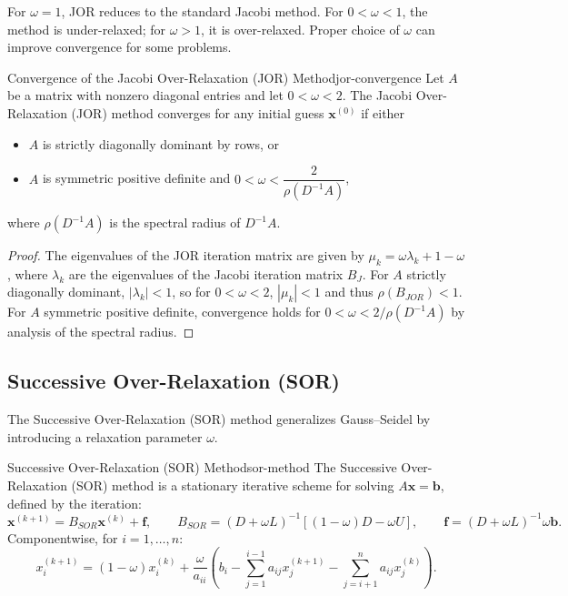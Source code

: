     For \(\omega = 1\), JOR reduces to the standard Jacobi method. For \(0 < \omega < 1\), the method is under-relaxed; for \(\omega > 1\), it is over-relaxed. Proper choice of \(\omega\) can improve convergence for some problems.
\begin{theorem}{Convergence of the Jacobi Over-Relaxation (JOR) Method}{jor-convergence}
    Let \(A\) be a matrix with nonzero diagonal entries and let \(0 < \omega < 2\). The Jacobi Over-Relaxation (JOR) method converges for any initial guess \(\mathbf{x}^{(0)}\) if either
    \begin{itemize}
        \item \(A\) is strictly diagonally dominant by rows, or
        \item \(A\) is symmetric positive definite and \(0 < \omega < \dfrac{2}{\rho(D^{-1}A)}\),
    \end{itemize}
    where \(\rho(D^{-1}A)\) is the spectral radius of \(D^{-1}A\).
\end{theorem}
\begin{proof}
    The eigenvalues of the JOR iteration matrix are given by \(\mu_k = \omega \lambda_k + 1 - \omega\), where \(\lambda_k\) are the eigenvalues of the Jacobi iteration matrix \(B_J\). For \(A\) strictly diagonally dominant, \(|\lambda_k| < 1\), so for \(0 < \omega < 2\), \(|\mu_k| < 1\) and thus \(\rho(B_{JOR}) < 1\). For \(A\) symmetric positive definite, convergence holds for \(0 < \omega < 2/\rho(D^{-1}A)\) by analysis of the spectral radius.
\end{proof}

\subsection{Successive Over-Relaxation (SOR)}
The Successive Over-Relaxation (SOR) method generalizes Gauss--Seidel by introducing a relaxation parameter \(\omega\).

\begin{definition}{Successive Over-Relaxation (SOR) Method}{sor-method}
    The Successive Over-Relaxation (SOR) method is a stationary iterative scheme for solving \(A\mathbf{x} = \mathbf{b}\), defined by the iteration:
    \[
        \mathbf{x}^{(k+1)} = B_{SOR} \mathbf{x}^{(k)} + \mathbf{f}, \qquad
        B_{SOR} = (D + \omega L)^{-1} \left[(1-\omega)D - \omega U\right], \qquad
        \mathbf{f} = (D + \omega L)^{-1} \omega \mathbf{b}.
    \]
    Componentwise, for \(i = 1, \ldots, n\):
    \begin{equation*}
        x_i^{(k+1)} = (1-\omega)x_i^{(k)} + \frac{\omega}{a_{ii}}\left(b_i - \sum_{j=1}^{i-1} a_{ij} x_j^{(k+1)} - \sum_{j=i+1}^n a_{ij} x_j^{(k)}\right).
    \end{equation*}
\end{definition}

